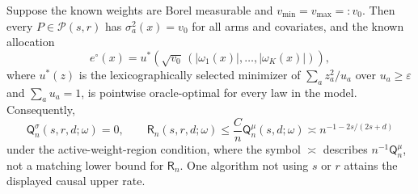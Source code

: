Suppose the known weights are Borel measurable and \(v_{\min}=v_{\max}=:v_0\). Then every \(P\in\mathcal P(s,r)\) has \(\sigma_a^2(x)=v_0\) for all arms and covariates, and the known allocation
\[
e^{\circ}(x)
=u^*\!\left(\sqrt{v_0}\,(|\omega_1(x)|,\ldots,|\omega_K(x)|)\right),
\]
where \(u^*(z)\) is the lexicographically selected minimizer of \(\sum_a z_a^2/u_a\) over \(u_a\geq\varepsilon\) and \(\sum_a u_a=1\), is pointwise oracle-optimal for every law in the model. Consequently,
\[
\mathsf Q_n^{\sigma}(s,r,d;\omega)=0,
\qquad
\mathsf R_n(s,r,d;\omega)
\leq \frac{C}{n}\mathsf Q_n^{\mu}(s,d;\omega)
\asymp n^{-1-2s/(2s+d)}
\]
under the active-weight-region condition, where the symbol \(\asymp\) describes \(n^{-1}\mathsf Q_n^{\mu}\), not a matching lower bound for \(\mathsf R_n\). One algorithm not using \(s\) or \(r\) attains the displayed causal upper rate.